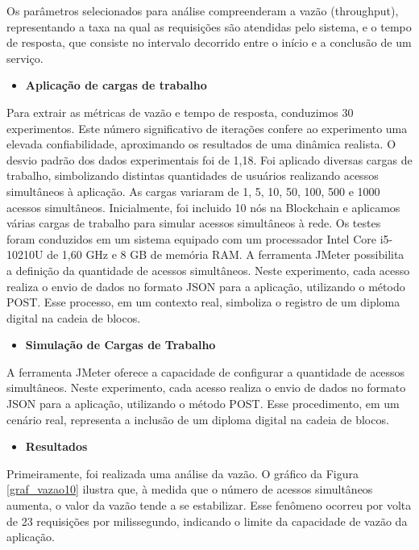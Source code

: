         Os parâmetros selecionados para análise compreenderam a vazão (throughput), representando a taxa na qual as requisições são atendidas pelo sistema, e o tempo de resposta, que consiste no intervalo decorrido entre o início e a conclusão de um serviço.

        \begin{itemize}[label= $\ast$]
            \item \textbf{Aplicação de cargas de trabalho}
        \end{itemize}

       Para extrair as métricas de vazão e tempo de resposta, conduzimos 30 experimentos. Este número significativo de iterações confere ao experimento uma elevada confiabilidade, aproximando os resultados de uma dinâmica realista. O desvio padrão dos dados experimentais foi de 1,18. Foi aplicado diversas cargas de trabalho, simbolizando distintas quantidades de usuários realizando acessos simultâneos à aplicação. As cargas variaram de 1, 5, 10, 50, 100, 500 e 1000 acessos simultâneos.
       Inicialmente, foi incluido 10 nós na Blockchain e aplicamos várias cargas de trabalho para simular acessos simultâneos à rede. Os testes foram conduzidos em um sistema equipado com um processador Intel Core i5-10210U de 1,60 GHz e 8 GB de memória RAM.
       A ferramenta JMeter possibilita a definição da quantidade de acessos simultâneos. Neste experimento, cada acesso realiza o envio de dados no formato JSON para a aplicação, utilizando o método POST. Esse processo, em um contexto real, simboliza o registro de um diploma digital na cadeia de blocos.

        \begin{itemize}[label= $\ast$]
            \item \textbf{Simulação de Cargas de Trabalho}
        \end{itemize}

        A ferramenta JMeter oferece a capacidade de configurar a quantidade de acessos simultâneos. Neste experimento, cada acesso realiza o envio de dados no formato JSON para a aplicação, utilizando o método POST. Esse procedimento, em um cenário real, representa a inclusão de um diploma digital na cadeia de blocos.

        \begin{itemize}[label= $\ast$]
            \item \textbf{ Resultados }
        \end{itemize}

       Primeiramente, foi realizada uma análise da vazão. O gráfico da Figura \ref{graf_vazao10} ilustra que, à medida que o número de acessos simultâneos aumenta, o valor da vazão tende a se estabilizar. Esse fenômeno ocorreu por volta de 23 requisições por milissegundo, indicando o limite da capacidade de vazão da aplicação.

